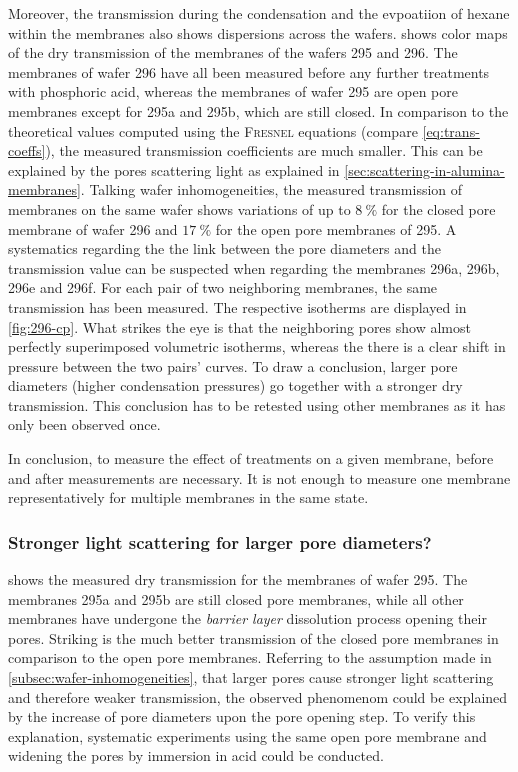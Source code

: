 \documentclass[../thesis.tex]{subfiles}
\begin{document}
        Moreover, the transmission during the condensation and the evpoatiion of hexane within the membranes also shows dispersions across the wafers.  shows color maps of the dry transmission of the membranes of the wafers 295 and 296. The membranes of wafer 296 have all been measured before any further treatments with phosphoric acid, whereas the membranes of wafer 295 are open pore membranes except for 295a and 295b, which are still closed. In comparison to the theoretical values computed using the \textsc{Fresnel} equations (compare \cref{eq:trans-coeffs}), the measured transmission coefficients are much smaller. This can be explained by the pores scattering light as explained in \cref{sec:scattering-in-alumina-membranes}. Talking wafer inhomogeneities, the measured transmission of membranes on the same wafer shows variations of up to $\SI{8}{\percent}$
        for the closed pore membrane of wafer 296 and $\SI{17}{\percent}$ for the open pore membranes of 295. A systematics regarding the the link between the pore diameters and the transmission value can be suspected when regarding the membranes 296a, 296b, 296e and 296f. For each pair of two neighboring membranes, the same transmission has been measured. The respective isotherms are displayed in \cref{fig:296-cp}. What strikes the eye is that the neighboring pores show almost perfectly superimposed volumetric isotherms, whereas the there is a clear shift in pressure between the two pairs' curves. To draw a conclusion, larger pore diameters (higher condensation pressures) go together with a stronger dry transmission. This conclusion has to be retested using other membranes as it has only been observed once.

        

        In conclusion, to measure the effect of treatments on a given membrane, before and after measurements are necessary. It is not enough to measure one membrane representatively for multiple membranes in the same state.


        \subsubsection{Stronger light scattering for larger pore diameters?}

           shows the measured dry transmission for the membranes of wafer 295. The membranes 295a and 295b are still closed pore membranes, while all other membranes have undergone the \textit{barrier layer} dissolution process opening their pores. Striking is the much better transmission of the closed pore membranes in comparison to the open pore membranes. Referring to the assumption made in \cref{subsec:wafer-inhomogeneities}, that larger pores cause stronger light scattering and therefore weaker transmission, the observed phenomenom could be explained by the increase of pore diameters upon the pore opening step. To verify this explanation, systematic experiments using the same open pore membrane and widening the pores by immersion in acid could be conducted.
\end{document}
